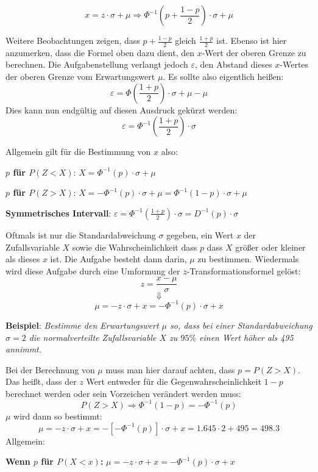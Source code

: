 $$x = z \cdot \sigma + \mu \Rightarrow \Phi^{-1}\left(p + \frac{1 -p}{2}\right) \cdot \sigma + \mu$$ 

\pagebreak

Weitere Beobachtungen zeigen, dass $p + \frac{1 - p}{2}$ gleich $\frac{1 + p}{2}$ ist. Ebenso ist hier anzumerken, dass die Formel oben dazu dient, den $x$-Wert der oberen Grenze zu berechnen. Die Aufgabenstellung verlangt jedoch $\varepsilon$, den Abstand dieses $x$-Wertes der oberen Grenze vom Erwartungswert $\mu$. Es sollte also eigentlich hei\ss{}en: $$\varepsilon = \Phi\left(\frac{1 + p}{2}\right) \cdot \sigma + \mu - \mu$$ Dies kann nun endg\"{u}ltig auf diesen Ausdruck gek\"{u}rzt werden: $$\varepsilon = \Phi^{-1}\left(\frac{1 + p}{2}\right) \cdot \sigma$$

Allgemein gilt f\"{u}r die Bestimmung von $x$ also:

\textbf{$p$ f\"{u}r $P(Z < X)$}: $X = \Phi^{-1}(p) \cdot \sigma + \mu$

\textbf{$p$ f\"{u}r $P(Z > X)$}: $X = -\Phi^{-1}(p) \cdot \sigma + \mu = \Phi^{-1}(1 - p) \cdot \sigma + \mu$

\textbf{Symmetrisches Intervall}: $\varepsilon = \Phi^{-1}\left(\frac{1 + p}{2}\right) \cdot \sigma = D^{-1}(p) \cdot \sigma$


Oftmals ist nur die Standardabweichung $\sigma$ gegeben, ein Wert $x$ der Zufallsvariable $X$ sowie die Wahrscheinlichkeit dass $p$ dass $X$ gr\"{o}\ss{}er oder kleiner als dieses $x$ ist. Die Aufgabe besteht dann darin, $\mu$ zu bestimmen. Wiedermals wird diese Aufgabe durch eine Umformung der $z$-Transformationsformel gel\"{o}st: $$z = \frac{x - \mu}{\sigma}$$ $$\Downarrow$$ $$\mu = -z \cdot \sigma + x = -\Phi^{-1}(p) \cdot \sigma + x$$

\textbf{Beispiel}: \emph{Bestimme den Erwartungswert $\mu$ so, dass bei einer Standardabweichung $\sigma = 2$ die normalverteilte Zufallsvariable $X$ zu $95 \%$ einen Wert h\"{o}her als 495 annimmt.}

Bei der Berechnung von $\mu$ muss man hier darauf achten, dass $p = P(Z > X)$. Das hei\ss{}t, dass der $z$ Wert entweder f\"{u}r die Gegenwahrscheinlichkeit $1 - p$ berechnet werden oder sein Vorzeichen ver\"{a}ndert werden muss: $$P(Z > X) \Rightarrow \Phi^{-1}(1 - p) = -\Phi^{-1}(p)$$ $\mu$ wird dann so bestimmt: $$\mu = -z \cdot \sigma + x = -[-\Phi^{-1}(p)] \cdot \sigma + x = 1.645 \cdot 2 + 495 = 498.3$$ Allgemein:

\textbf{Wenn $p$ f\"{u}r $P(X < x)$:} $\mu = -z \cdot \sigma + x = -\Phi^{-1}(p) \cdot \sigma + x$

